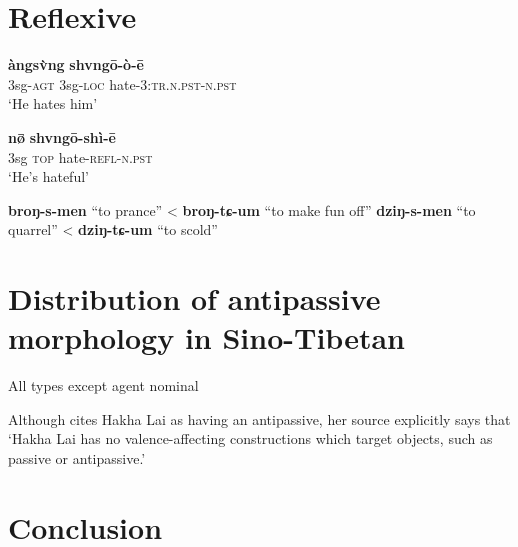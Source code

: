 \documentclass[oneside,a4paper,11pt]{article}
\newcommand{\ipa}[1]{{\phon\textbf{#1}}}
\begin{document}
 
\section{Reflexive}
\citet{janic.these}
\citet{jacques16si}
\citet[294]{lapolla01valency}
\begin{exe}
\ex 
\gll \ipa{à:ngi} \ipa{àngsv̀ng} \ipa{shvngō-ò-ē} \\
3sg-\textsc{agt} 3sg-\textsc{loc} hate-\textsc{3:tr.n.pst-n.pst} \\
\glt `He hates him'
\end{exe}
\begin{exe}
\ex 
\gll  \ipa{àng} \ipa{nø̄} \ipa{shvngō-shì-ē} \\
3sg \textsc{top} hate-\textsc{refl-n.pst} \\
\glt `He's hateful'
 \end{exe}
\citet[452;466]{widmer14bunan}
\ipa{broŋ-s-men} “to prance” < \ipa{broŋ-tɕ-um} “to make fun off”
\ipa{dziŋ-s-men} “to quarrel” < \ipa{dziŋ-tɕ-um} “to scold”

\section{Distribution of antipassive morphology in Sino-Tibetan}
All types except agent nominal

Although \citet{polinsky11antipassive} cites Hakha Lai as having an antipassive, her source \citet[37]{peterson07appl} explicitly says that `Hakha Lai has no valence-affecting constructions which target objects, such as passive or antipassive.'


\section*{Conclusion}




 
\end{document}
